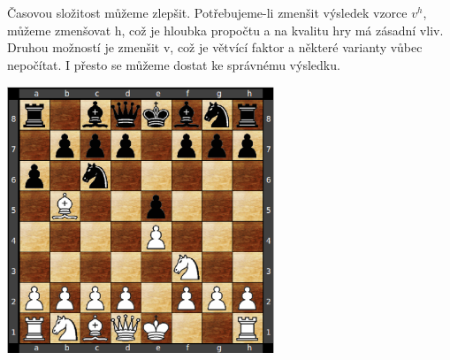 \documentclass[11pt, titlepage]{article}
\begin{document}
Časovou složitost můžeme zlepšit. Potřebujeme-li zmenšit výsledek vzorce \begin{math}v^h\end{math}, můžeme zmenšovat h, což je hloubka propočtu a na kvalitu hry má zásadní vliv. Druhou možností je zmenšit v, což je větvící faktor a některé varianty vůbec nepočítat. I přesto se můžeme dostat ke správnému výsledku.

\begin{center}
	\includegraphics[width=8cm, height=8cm]{diagram1.ps}
\end{center}
\end{document}
